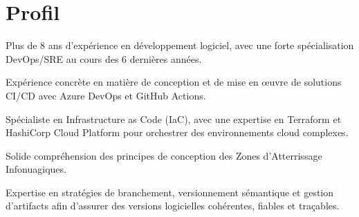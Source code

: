\documentclass[11pt]{deedy-resume-openfont}
\begin{document}
    
%
%
{}
%
%
\vspace{0.8cm}
\section{Profil}
\vspace{0.4cm}
\begin{tightemize}
	\item Plus de 8 ans d'expérience en développement logiciel, avec une forte spécialisation DevOps/SRE au cours des 6 dernières années.
	\item Expérience concrète en matière de conception et de mise en œuvre de solutions CI/CD avec Azure DevOps et GitHub Actions.
	\item Spécialiste en Infrastructure as Code (IaC), avec une expertise en Terraform et HashiCorp Cloud Platform pour orchestrer des environnements cloud complexes.
	\item Solide compréhension des principes de conception des Zones d'Atterrissage Infonuagiques.
	\item Expertise en stratégies de branchement, versionnement sémantique et gestion d'artifacts afin d'assurer des versions logicielles cohérentes, fiables et traçables.
\end{tightemize}
%
%
\vspace{0.8cm}
\end{document}
